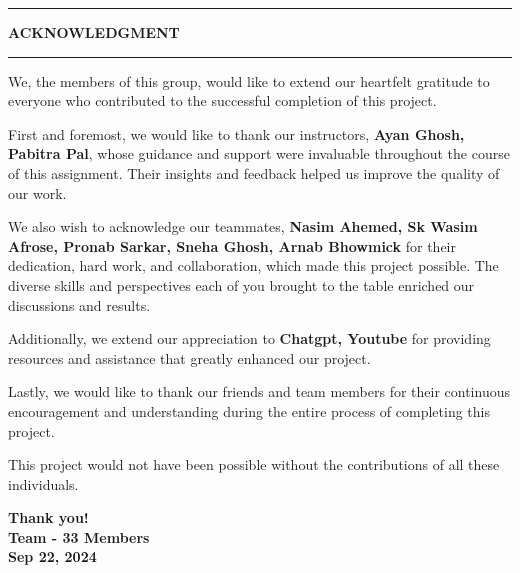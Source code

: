 \documentclass[a4paper,14pt]{article}
\begin{document}
\begin{center}
    \hrule height 0.5pt
    \vspace{0.2cm}
    {\LARGE \textbf{ACKNOWLEDGMENT}} \\
    \vspace{0.2cm}
    \hrule height 0.5pt
\end{center}

\vspace{1cm}

We, the members of this group, would like to extend our heartfelt gratitude to everyone who contributed to the successful completion of this project.

\vspace{0.5cm}

First and foremost, we would like to thank our instructors, \textbf{Ayan Ghosh, Pabitra Pal}, whose guidance and support were invaluable throughout the course of this assignment. Their insights and feedback helped us improve the quality of our work.

\vspace{0.5cm}

We also wish to acknowledge our teammates, \textbf{Nasim Ahemed, Sk Wasim Afrose, Pronab Sarkar, Sneha Ghosh, Arnab Bhowmick} for their dedication, hard work, and collaboration, which made this project possible. The diverse skills and perspectives each of you brought to the table enriched our discussions and results.

\vspace{0.5cm}

Additionally, we extend our appreciation to \textbf{Chatgpt, Youtube} for providing resources and assistance that greatly enhanced our project.

\vspace{0.5cm}

Lastly, we would like to thank our friends and team members for their continuous encouragement and understanding during the entire process of completing this project.

\vspace{0.5cm}

This project would not have been possible without the contributions of all these individuals.

\vspace{1cm}

\begin{flushleft}
\textbf{Thank you!} \\
\textbf{Team - 33 Members} \\
\textbf{Sep 22, 2024}
\end{flushleft}
\end{document}
